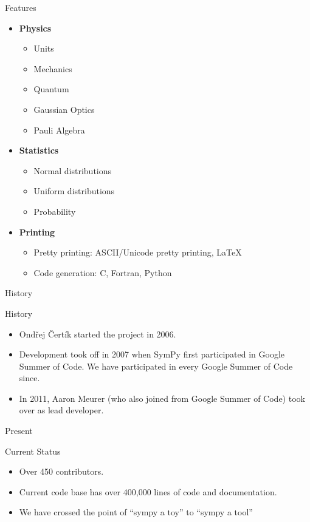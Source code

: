 \documentclass[xcolor=svgnames]{beamer}
\begin{document}
\begin{frame}{Features}
\begin{multicols}{2}
\begin{itemize}
    \item \textbf{Physics}
      \begin{itemize}
        \tiny
      \item Units
      \item Mechanics
      \item Quantum
      \item Gaussian Optics
      \item Pauli Algebra
      \end{itemize}

    \item \textbf{Statistics}
      \begin{itemize}
        \tiny
      \item Normal distributions
      \item Uniform distributions
      \item Probability
      \end{itemize}

    \item \textbf{Printing}
      \begin{itemize}
        \tiny
      \item Pretty printing: ASCII/Unicode pretty printing, LaTeX
      \item Code generation: C, Fortran, Python
      \end{itemize}
    \end{itemize}
  \end{multicols}
\end{frame}

\begin{frame}{History}
  \begin{block}{History}
    \begin{itemize}
    \item Ondřej Čertík started the project in 2006.
    \item Development took off in 2007 when SymPy first participated in Google
      Summer of Code. We have participated in every Google Summer of Code since.
    \item In 2011, Aaron Meurer (who also joined from Google Summer of Code) took
      over as lead developer.
    \end{itemize}
  \end{block}
\end{frame}

\begin{frame}{Present}
  \begin{block}{Current Status}
    \begin{itemize}
    \item Over 450 contributors.
    \item Current code base has over 400,000 lines of code and documentation.
    \item We have crossed the point of ``sympy a toy'' to ``sympy a tool''
    \end{itemize}
  \end{block}
\end{frame}
\end{document}
